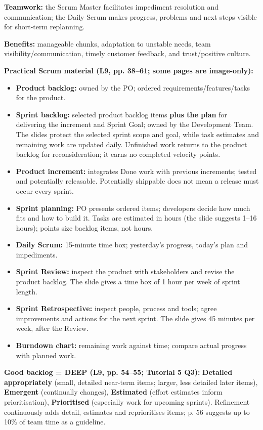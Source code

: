 \begin{studycolumns}
\textbf{Teamwork:} the Scrum Master facilitates impediment resolution and communication; the Daily Scrum makes progress, problems and next steps visible for short-term replanning.

\textbf{Benefits:} manageable chunks, adaptation to unstable needs, team visibility/\allowbreak{}communication, timely customer feedback, and trust/\allowbreak{}positive culture.

\textbf{Practical Scrum material (L9, pp. 38--61; some pages are image-only):}

\begin{itemize}
\item \textbf{Product backlog:} owned by the PO; ordered requirements/\allowbreak{}features/\allowbreak{}tasks for the product.
\item \textbf{Sprint backlog:} selected product backlog items \textbf{plus the plan} for delivering the increment and Sprint Goal; owned by the Development Team. The slides protect the selected sprint scope and goal, while task estimates and remaining work are updated daily. Unfinished work returns to the product backlog for reconsideration; it earns no completed velocity points.
\item \textbf{Product increment:} integrates Done work with previous increments; tested and potentially releasable. Potentially shippable does not mean a release must occur every sprint.
\item \textbf{Sprint planning:} PO presents ordered items; developers decide how much fits and how to build it. Tasks are estimated in hours (the slide suggests 1--16 hours); points size backlog items, not hours.
\item \textbf{Daily Scrum:} 15-minute time box; yesterday's progress, today's plan and impediments.
\item \textbf{Sprint Review:} inspect the product with stakeholders and revise the product backlog. The slide gives a time box of 1 hour per week of sprint length.
\item \textbf{Sprint Retrospective:} inspect people, process and tools; agree improvements and actions for the next sprint. The slide gives 45 minutes per week, after the Review.
\item \textbf{Burndown chart:} remaining work against time; compare actual progress with planned work.
\end{itemize}
\textbf{Good backlog = DEEP (L9, pp. 54--55; Tutorial 5 Q3):} \textbf{Detailed appropriately} (small, detailed near-term items; larger, less detailed later items), \textbf{Emergent} (continually changes), \textbf{Estimated} (effort estimates inform prioritisation), \textbf{Prioritised} (especially work for upcoming sprints). Refinement continuously adds detail, estimates and reprioritises items; p. 56 suggests up to 10\% of team time as a guideline.


\end{studycolumns}
